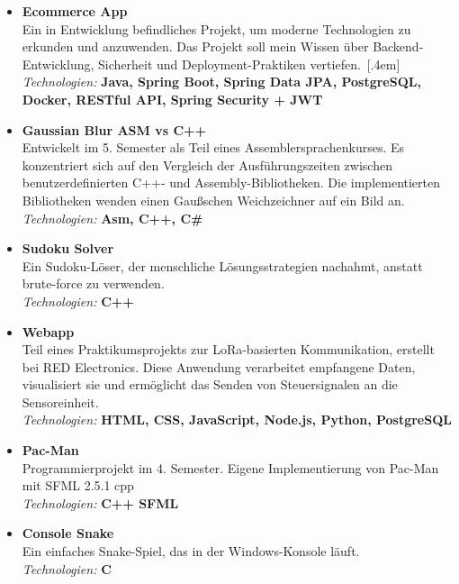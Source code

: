 \documentclass[11pt,letterpaper]{article}
\begin{document}
\begin{itemize}[leftmargin=0.5cm]
\setlength\itemsep{0.4em}
    \item \textbf{Ecommerce App} \\
    Ein in Entwicklung befindliches Projekt, um moderne Technologien zu erkunden und anzuwenden.
    Das Projekt soll mein Wissen über Backend-Entwicklung, Sicherheit und Deployment-Praktiken vertiefen.\ [.4em]
    \textit{Technologien:} \textbf{Java, Spring Boot, Spring Data JPA, PostgreSQL, Docker, RESTful API, Spring Security + JWT}

    \item \textbf{Gaussian Blur ASM vs C++} \\
    Entwickelt im 5. Semester als Teil eines Assemblersprachenkurses.
    Es konzentriert sich auf den Vergleich der Ausführungszeiten zwischen benutzerdefinierten C++- und Assembly-Bibliotheken.
    Die implementierten Bibliotheken wenden einen Gaußschen Weichzeichner auf ein Bild an.\\ [.3em]
    \textit{Technologien:} \textbf{Asm, C++, C\#}

    \item \textbf{Sudoku Solver} \\
    Ein Sudoku-Löser, der menschliche Lösungsstrategien nachahmt, anstatt brute-force zu verwenden.\\ [.3em]
    \textit{Technologien:} \textbf{C++}

    \item \textbf{Webapp} \\
    Teil eines Praktikumsprojekts zur LoRa-basierten Kommunikation, erstellt bei RED Electronics.
    Diese Anwendung verarbeitet empfangene Daten, visualisiert sie und ermöglicht das Senden von Steuersignalen an die Sensoreinheit.\\ [.3em]
    \textit{Technologien:} \textbf{HTML, CSS, JavaScript, Node.js, Python, PostgreSQL}

    \item \textbf{Pac-Man} \\
    Programmierprojekt im 4. Semester. Eigene Implementierung von Pac-Man mit SFML 2.5.1 cpp \\ [.3em]
    \textit{Technologien:} \textbf{C++ SFML}

    \item \textbf{Console Snake} \\
    Ein einfaches Snake-Spiel, das in der Windows-Konsole läuft.\\ [.3em]
    \textit{Technologien:} \textbf{C}

\end{itemize}
\end{document}
